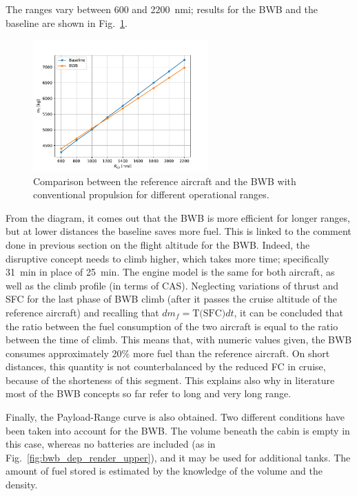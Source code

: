 The ranges vary between 600 and 2200~nmi; results for the BWB and the baseline are shown in Fig.~\ref{fig:bwb_op_range_comp}.
\begin{figure}[!h]
	\centering
	\includegraphics[keepaspectratio, width=0.6\textwidth]{images/chap4/bwb_op_range_comp}
	\caption{Comparison between the reference aircraft and the BWB with conventional propulsion for different operational ranges.}
	\label{fig:bwb_op_range_comp}
\end{figure}
From the diagram, it comes out that the BWB is more efficient for longer ranges, but at lower distances the baseline saves more fuel. 
This is linked to the comment done in previous section on the flight altitude for the BWB. 
Indeed, the disruptive concept needs to climb higher, which takes more time; specifically 31~\si{\minute} in place of 25~\si{\minute}.
The engine model is the same for both aircraft, as well as the climb profile (in terms of CAS). 
Neglecting variations of thrust and SFC for the last phase of BWB climb (after it passes the cruise altitude of the reference aircraft) and recalling that $dm_f=\textrm{T(SFC)}dt$, it can be concluded that the ratio between the fuel consumption of the two aircraft is equal to the ratio between the time of climb.
This means that, with numeric values given, the BWB consumes approximately 20\% more fuel than the reference aircraft. 
On short distances, this quantity is not counterbalanced by the reduced FC in cruise, because of the shorteness of this segment. 
This explains also why in literature most of the BWB concepts so far refer to long and very long range.  

Finally, the Payload-Range curve is also obtained. 
Two different conditions have been taken into account for the BWB. 
The volume beneath the cabin is empty in this case, whereas no batteries are included (as in Fig.~\ref{fig:bwb_dep_render_upper}), and it may be used for additional tanks.
The amount of fuel stored is estimated by the knowledge of the volume and the density. 

